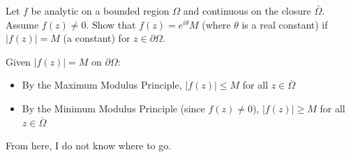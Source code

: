 \documentclass[12pt]{article}
\begin{document}

\begin{statement}[14]
  Let $f$ be analytic on a bounded region $\Omega$ and continuous on the closure $\bar{\Omega}$. Assume 
  $f(z) \neq 0$. Show that $f(z) = e^{i\theta}M$ (where $\theta$ is a real constant) if 
  $\vert f(z) \vert = M$ (a constant) for $z \in \partial \Omega$.
\end{statement}
\begin{newproof}
    Given \( |f(z)| = M \) on \( \partial\Omega \):
    \begin{itemize}
        \item By the Maximum Modulus Principle, \( |f(z)| \leq M \) for all \( z \in \overline{\Omega} \)
        \item By the Minimum Modulus Principle (since \( f(z) \neq 0 \)), \( |f(z)| \geq M \) for all \( z \in \overline{\Omega} \)
    \end{itemize}
    From here, I do not know where to go.
\end{newproof}
\end{document}
